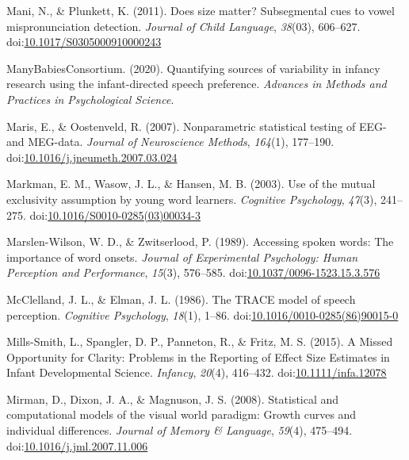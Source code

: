 \documentclass[man]{apa6}
\begin{document}
\leavevmode\hypertarget{ref-Mani2011}{}%
Mani, N., \& Plunkett, K. (2011). Does size matter? Subsegmental cues to vowel mispronunciation detection. \emph{Journal of Child Language}, \emph{38}(03), 606--627. doi:\href{https://doi.org/10.1017/S0305000910000243}{10.1017/S0305000910000243}

\leavevmode\hypertarget{ref-MB1}{}%
ManyBabiesConsortium. (2020). Quantifying sources of variability in infancy research using the infant-directed speech preference. \emph{Advances in Methods and Practices in Psychological Science}.

\leavevmode\hypertarget{ref-Maris2007}{}%
Maris, E., \& Oostenveld, R. (2007). Nonparametric statistical testing of EEG- and MEG-data. \emph{Journal of Neuroscience Methods}, \emph{164}(1), 177--190. doi:\href{https://doi.org/10.1016/j.jneumeth.2007.03.024}{10.1016/j.jneumeth.2007.03.024}

\leavevmode\hypertarget{ref-Markman2003}{}%
Markman, E. M., Wasow, J. L., \& Hansen, M. B. (2003). Use of the mutual exclusivity assumption by young word learners. \emph{Cognitive Psychology}, \emph{47}(3), 241--275. doi:\href{https://doi.org/10.1016/S0010-0285(03)00034-3}{10.1016/S0010-0285(03)00034-3}

\leavevmode\hypertarget{ref-Marslen-Wilson1989}{}%
Marslen-Wilson, W. D., \& Zwitserlood, P. (1989). Accessing spoken words: The importance of word onsets. \emph{Journal of Experimental Psychology: Human Perception and Performance}, \emph{15}(3), 576--585. doi:\href{https://doi.org/10.1037/0096-1523.15.3.576}{10.1037/0096-1523.15.3.576}

\leavevmode\hypertarget{ref-McClelland1986}{}%
McClelland, J. L., \& Elman, J. L. (1986). The TRACE model of speech perception. \emph{Cognitive Psychology}, \emph{18}(1), 1--86. doi:\href{https://doi.org/10.1016/0010-0285(86)90015-0}{10.1016/0010-0285(86)90015-0}

\leavevmode\hypertarget{ref-Mills-Smith2015}{}%
Mills-Smith, L., Spangler, D. P., Panneton, R., \& Fritz, M. S. (2015). A Missed Opportunity for Clarity: Problems in the Reporting of Effect Size Estimates in Infant Developmental Science. \emph{Infancy}, \emph{20}(4), 416--432. doi:\href{https://doi.org/10.1111/infa.12078}{10.1111/infa.12078}

\leavevmode\hypertarget{ref-Mirman2008}{}%
Mirman, D., Dixon, J. A., \& Magnuson, J. S. (2008). Statistical and computational models of the visual world paradigm: Growth curves and individual differences. \emph{Journal of Memory \& Language}, \emph{59}(4), 475--494. doi:\href{https://doi.org/10.1016/j.jml.2007.11.006}{10.1016/j.jml.2007.11.006}
\end{document}
